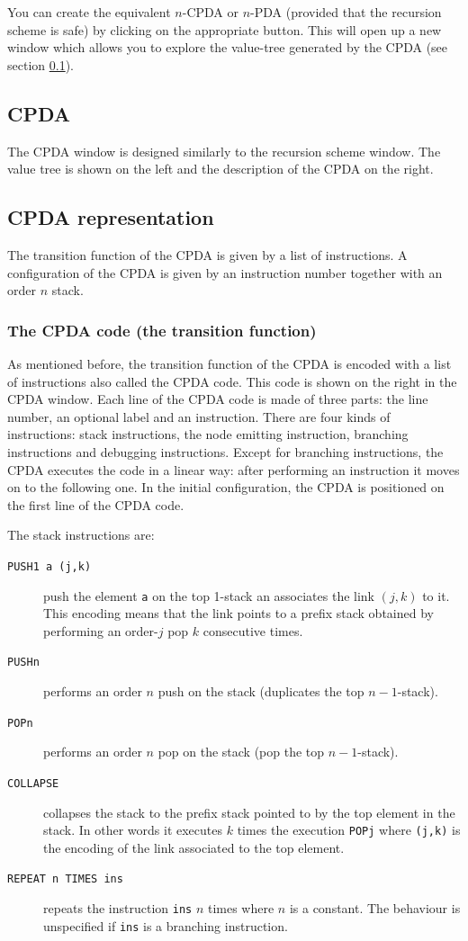 \documentclass{article}
\begin{document}
You can create the equivalent $n$-CPDA or $n$-PDA (provided that the recursion scheme is safe) by clicking on the appropriate button. This will open up a new window which allows you to explore
the value-tree generated by the CPDA (see section \ref{sec:cpda}).



\subsection{CPDA}
\label{sec:cpda}
The CPDA window is designed similarly to the recursion scheme window. The value tree is shown on the left
 and the description of the CPDA on the right. 

\subsection{CPDA representation}
The transition function of the CPDA is given by a list of instructions. 
A configuration of the CPDA is given by an instruction number together with an order $n$ stack.

\subsubsection{The CPDA code (the transition function)}
As mentioned before, the transition function of the CPDA is encoded with a list of instructions also 
called the CPDA code. This code is shown on the right in the CPDA window.
 Each line of the CPDA code is made of three parts: the line number, an optional label and an instruction. There are four kinds of instructions: stack instructions, the node emitting instruction, branching instructions and debugging instructions. Except for branching instructions, the CPDA executes the code in a linear way:
 after performing an instruction it moves on to the following one.
 In the initial configuration, the CPDA is positioned on the first line of the CPDA code.

The stack instructions are:
\begin{description}
  \item[{\tt PUSH1 a (j,k)}] push the element {\tt a} on the top 1-stack an associates the link $(j,k)$ to it. This encoding means that the link points to a prefix stack obtained by performing an order-$j$ pop $k$ consecutive times.
  \item[{\tt PUSHn}] performs an order $n$ push on the stack (duplicates the top $n-1$-stack).
  \item[{\tt POPn}] performs an order $n$ pop on the stack (pop the top $n-1$-stack).
  \item[{\tt COLLAPSE}] collapses the stack to the prefix stack pointed to by the top element in the stack. In other words it executes $k$ times the execution {\tt POPj} where {\tt (j,k)} is the encoding of the link associated to the top element.

  \item[{\tt REPEAT n TIMES ins}] repeats the instruction {\tt ins} $n$ times where $n$ is a constant. The behaviour is unspecified if {\tt ins} is a branching instruction.
\end{description}
\end{document}
